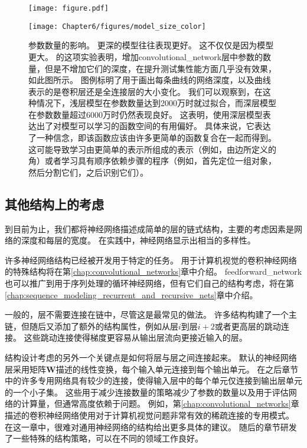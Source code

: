 \begin{figure}[!htb]
\ifOpenSource
\centerline{\texttt{[image: figure.pdf]}}
\else
\centerline{\texttt{[image: Chapter6/figures/model\_size\_color]}}
\fi
\caption{参数数量的影响。
更深的模型往往表现更好。
这不仅仅是因为模型更大。
\cite{Goodfellow+et+al-ICLR2014a}的这项实验表明，增加\gls{convolutional_network}层中参数的数量，但是不增加它们的深度，在提升测试集性能方面几乎没有效果，如此图所示。
图例标明了用于画出每条曲线的网络深度，以及曲线表示的是卷积层还是全连接层的大小变化。
我们可以观察到，在这种情况下，浅层模型在参数数量达到2000万时就过拟合，而深层模型在参数数量超过6000万时仍然表现良好。
这表明，使用深层模型表达出了对模型可以学习的函数空间的有用偏好。
具体来说，它表达了一种信念，即该函数应该由许多更简单的函数复合在一起而得到。
这可能导致学习由更简单的表示所组成的表示（例如，由边所定义的角）或者学习具有顺序依赖步骤的程序（例如，首先定位一组对象，然后分割它们，之后识别它们）。}
\label{fig:chap6_model_size_color}
\end{figure}

\subsection{其他结构上的考虑}
\label{sec:other_architectural_considerations}

到目前为止，我们都将神经网络描述成简单的层的链式结构，主要的考虑因素是网络的深度和每层的宽度。
在实践中，神经网络显示出相当的多样性。

许多神经网络结构已经被开发用于特定的任务。
用于计算机视觉的卷积神经网络的特殊结构将在第\ref{chap:convolutional_networks}章中介绍。
\gls{feedforward_network}也可以推广到用于序列处理的循环神经网络，但有它们自己的结构考虑，将在第\ref{chap:sequence_modeling_recurrent_and_recursive_nets}章中介绍。


一般的，层不需要连接在链中，尽管这是最常见的做法。
许多结构构建了一个主链，但随后又添加了额外的结构属性，例如从层$i$到层$i+2$或者更高层的跳动连接。
这些跳动连接使得梯度更容易从输出层流向更接近输入的层。

结构设计考虑的另外一个关键点是如何将层与层之间连接起来。
默认的神经网络层采用矩阵$\bm{W}$描述的线性变换，每个输入单元连接到每个输出单元。
在之后章节中的许多专用网络具有较少的连接，使得输入层中的每个单元仅连接到输出层单元的一个小子集。
这些用于减少连接数量的策略减少了参数的数量以及用于评估网络的计算量，但通常高度依赖于问题。
例如，第\ref{chap:convolutional_networks}章描述的卷积神经网络使用对于计算机视觉问题非常有效的稀疏连接的专用模式。
在这一章中，很难对通用神经网络的结构给出更多具体的建议。
随后的章节研发了一些特殊的结构策略，可以在不同的领域工作良好。

